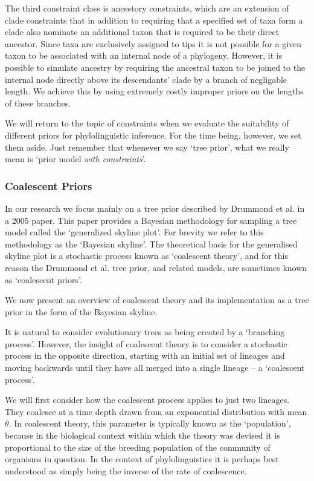\documentclass[10pt,journal,compsoc]{IEEEtran}
\begin{document}
The third constraint class is ancestory constraints, which are an extension of clade constraints that in addition to requiring that a specified set of taxa form a clade also nominate an additional taxon that is required to be their direct ancestor. Since taxa are exclusively assigned to tips it is not possible for a given taxon to be associated with an internal node of a phylogeny. However, it is possible to simulate ancestry by requiring the ancestral taxon to be joined to the internal node directly above its descendants' clade by a branch of negligable length. We achieve this by using extremely costly improper priors on the lengths of these branches.

We will return to the topic of constraints when we evaluate the suitability of different priors for phylolinguistic inference. For the time being, however, we set them aside. Just remember that whenever we say `tree prior', what we really mean is `prior model \textit{with constraints}'.

\subsubsection{Coalescent Priors}

In our research we focus mainly on a tree prior described by Drummond et al. in a 2005 paper. This paper provides a Bayesian methodology for sampling a tree model called the `generalized skyline plot'. For brevity we refer to this methodology as the `Bayesian skyline'. The theoretical basis for the generalised skyline plot is a stochastic process known as `coalescent theory', and for this reason the Drummond et al. tree prior, and related models, are sometimes known as `coalescent priors'.

We now present an overview of coalescent theory and its implementation as a tree prior in the form of the Bayesian skyline.

It is natural to consider evolutionary trees as being created by a `branching process'. However, the insight of coalescent theory is to consider a stochastic process in the opposite direction, starting with an initial set of lineages and moving backwards until they have all merged into a single lineage -- a `coalescent process'.

We will first consider how the coalescent process applies to just two lineages. They coalesce at a time depth drawn from an exponential distribution with mean $\theta$. In coalescent theory, this parameter is typically known as the `population', because in the biological context within which the theory was devised it is proportional to the size of the breeding population of the community of organisms in question. In the context of phylolinguistics it is perhaps best understood as simply being the inverse of the rate of coalescence.
\end{document}
